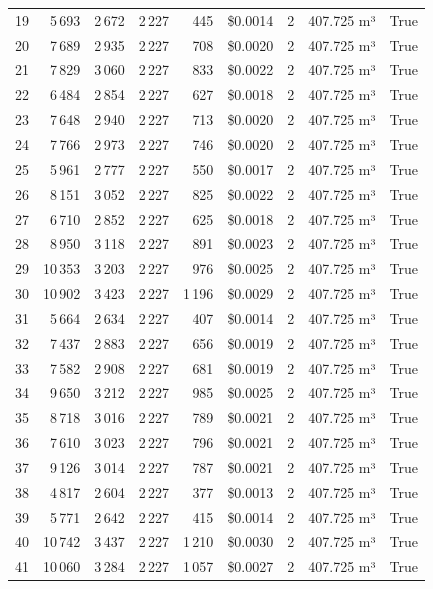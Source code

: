 \documentclass[a4paper,11pt]{article}
\begin{document}
\begin{table}[ht]
\begin{tabular}{r r r r r r r p{3cm} l}
19 & 5\,693 & 2\,672 & 2\,227 & 445 & \$0.0014 & 2 & 407.725 m³ & True \\
20 & 7\,689 & 2\,935 & 2\,227 & 708 & \$0.0020 & 2 & 407.725 m³ & True \\
21 & 7\,829 & 3\,060 & 2\,227 & 833 & \$0.0022 & 2 & 407.725 m³ & True \\
22 & 6\,484 & 2\,854 & 2\,227 & 627 & \$0.0018 & 2 & 407.725 m³ & True \\
23 & 7\,648 & 2\,940 & 2\,227 & 713 & \$0.0020 & 2 & 407.725 m³ & True \\
24 & 7\,766 & 2\,973 & 2\,227 & 746 & \$0.0020 & 2 & 407.725 m³ & True \\
25 & 5\,961 & 2\,777 & 2\,227 & 550 & \$0.0017 & 2 & 407.725 m³ & True \\
26 & 8\,151 & 3\,052 & 2\,227 & 825 & \$0.0022 & 2 & 407.725 m³ & True \\
27 & 6\,710 & 2\,852 & 2\,227 & 625 & \$0.0018 & 2 & 407.725 m³ & True \\
28 & 8\,950 & 3\,118 & 2\,227 & 891 & \$0.0023 & 2 & 407.725 m³ & True \\
29 & 10\,353 & 3\,203 & 2\,227 & 976 & \$0.0025 & 2 & 407.725 m³ & True \\
30 & 10\,902 & 3\,423 & 2\,227 & 1\,196 & \$0.0029 & 2 & 407.725 m³ & True \\
31 & 5\,664 & 2\,634 & 2\,227 & 407 & \$0.0014 & 2 & 407.725 m³ & True \\
32 & 7\,437 & 2\,883 & 2\,227 & 656 & \$0.0019 & 2 & 407.725 m³ & True \\
33 & 7\,582 & 2\,908 & 2\,227 & 681 & \$0.0019 & 2 & 407.725 m³ & True \\
34 & 9\,650 & 3\,212 & 2\,227 & 985 & \$0.0025 & 2 & 407.725 m³ & True \\
35 & 8\,718 & 3\,016 & 2\,227 & 789 & \$0.0021 & 2 & 407.725 m³ & True \\
36 & 7\,610 & 3\,023 & 2\,227 & 796 & \$0.0021 & 2 & 407.725 m³ & True \\
37 & 9\,126 & 3\,014 & 2\,227 & 787 & \$0.0021 & 2 & 407.725 m³ & True \\
38 & 4\,817 & 2\,604 & 2\,227 & 377 & \$0.0013 & 2 & 407.725 m³ & True \\
39 & 5\,771 & 2\,642 & 2\,227 & 415 & \$0.0014 & 2 & 407.725 m³ & True \\
40 & 10\,742 & 3\,437 & 2\,227 & 1\,210 & \$0.0030 & 2 & 407.725 m³ & True \\
41 & 10\,060 & 3\,284 & 2\,227 & 1\,057 & \$0.0027 & 2 & 407.725 m³ & True \\

\end{tabular}
\end{table}
\end{document}
